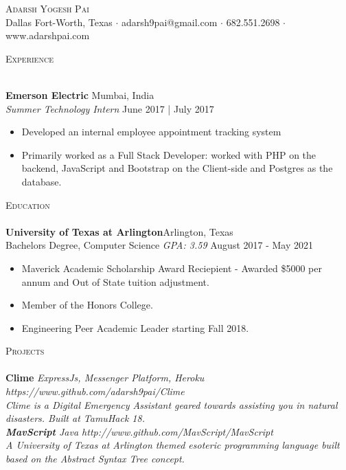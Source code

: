 \documentclass[a4paper]{article}
\newcommand{\lineunder} {
    \vspace*{-8pt} \\
    \hspace*{-18pt} \hrulefill \\
}
\newcommand{\header} [1] {
    {\hspace*{-18pt}\vspace*{6pt} \textsc{#1}}
    \vspace*{-6pt} \lineunder
}
\begin{document}
\vspace*{-40pt}

    


\vspace*{-10pt}
\begin{center}
	{\Huge \scshape {Adarsh Yogesh Pai}}\\
	Dallas Fort-Worth, Texas $\cdot$ adarsh9pai@gmail.com $\cdot$ 682.551.2698 $\cdot$ www.adarshpai.com\\
\end{center}

\header{Experience}
\vspace{1mm}

\textbf{Emerson Electric} \hfill Mumbai, India\\
\textit{Summer Technology Intern} \hfill June 2017 | July 2017\\
\vspace{-1mm}
\begin{itemize} \itemsep 1pt
	\item Developed an internal employee appointment tracking system
	\item Primarily worked as a Full Stack Developer: worked with PHP on the backend, JavaScript and Bootstrap on the Client-side and Postgres as the database.
\end{itemize}


\header{Education}
\textbf{University of Texas at Arlington}\hfill Arlington, Texas\\
Bachelor\textquotesingle{}s Degree, Computer Science \textit{GPA: 3.59} \hfill August 2017 - May 2021\\

\begin{itemize} \itemsep 1pt
	\item Maverick Academic Scholarship Award Reciepient - Awarded \$5000 per annum and Out of State tuition adjustment.
	\item Member of the Honors College.
    \item Engineering Peer Academic Leader starting Fall 2018.
\end{itemize}
\vspace{2mm}

\header{Projects}
{\textbf{Clime}} \sl {ExpressJs, Messenger Platform, Heroku} \hfill https://www.github.com/adarsh9pai/Clime\\
Clime is a Digital Emergency Assistant geared towards assisting you in natural disasters. Built at TamuHack \textquotesingle{}18.\\
\vspace*{2mm}
{\textbf{MavScript}} \sl {Java} \hfill http://www.github.com/MavScript/MavScript\\
A University of Texas at Arlington themed esoteric programming language built based on the Abstract Syntax Tree concept.\\
\vspace*{2mm}
\end{document}
